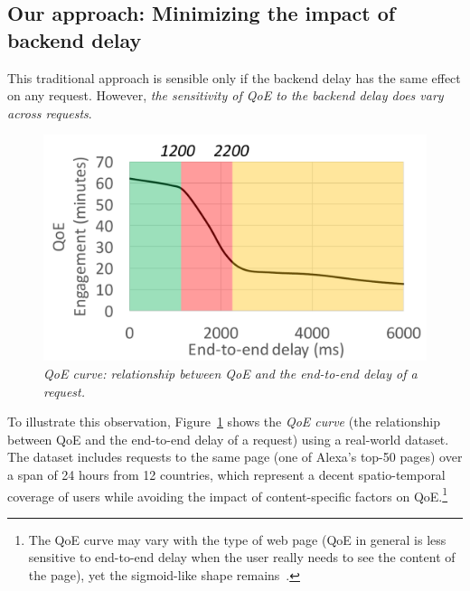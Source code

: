 \subsection{Our approach: Minimizing the impact of backend delay}

This traditional approach is sensible only if the backend delay has the same effect on any request.
However, {\em the sensitivity of QoE to the backend delay does vary across requests}. %

\begin{figure}
	\centering
	\vspace{-0.5cm}
	\includegraphics[width=1.0\textwidth]{figs/qoe-curve.pdf}
	\caption{\em QoE curve: relationship between QoE and the end-to-end delay of a request.}
	\label{fig:qoe-curve}
\end{figure}
To illustrate this observation, Figure~\ref{fig:qoe-curve} shows the {\em QoE curve} (\ie the relationship between QoE and the end-to-end delay of a request) using  a real-world dataset.
The dataset includes requests to the same page (one of Alexa's top-50 pages) over a span of 24 hours from 12 countries, which represent a decent spatio-temporal coverage of users while avoiding the impact of content-specific factors on QoE.\footnote{The QoE curve may vary with the type of web page (\eg QoE in general is less sensitive to end-to-end delay when the user really needs to see the content of the page), yet the sigmoid-like shape remains~\cite{akamai-report}.} 
